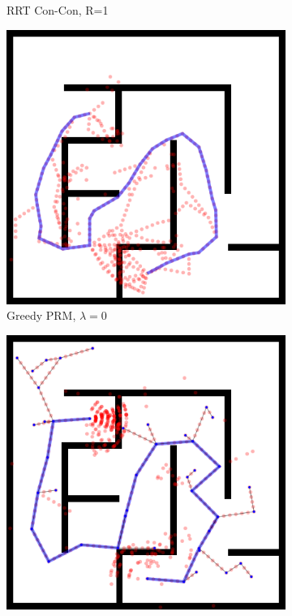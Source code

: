 \begin{figure}
\begin{subfigure}[b]{0.3\textwidth}
\caption{RRT Con-Con, R=1}
\end{subfigure}%
\quad
\begin{subfigure}[b]{0.3\textwidth}
\includegraphics[width=\textwidth]{figs/compare-2d-rrtc1-checkmask-l00-s1.png}
\caption{Greedy PRM, $\lambda=0$}
\end{subfigure}%
\vspace{0.05in}
\begin{subfigure}[b]{0.3\textwidth}
\includegraphics[width=\textwidth]{figs/compare-2d-rrtc1-rrtextcon-r6-s1.png}

\end{subfigure}
\end{figure}
